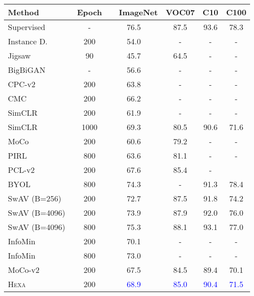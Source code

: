 \documentclass[10pt,twocolumn,letterpaper]{article}
\newcommand{\shortname}{\textsc{Hexa}}
\begin{document}
\begin{table}[t!]
\footnotesize \centering
\begin{tabular}{ @{\hspace{-0pt}}l@{\hspace{8pt}}c@{\hspace{2pt}}|@{\hspace{7pt}}c@{\hspace{7pt}}c@{\hspace{7pt}}c@{\hspace{7pt}}c}\toprule
 Method   & Epoch &  ~~ImageNet  &  VOC07 &  C10 &  C100  \\ 
\hline
Supervised & - & 76.5 &  87.5 & 93.6 & 78.3 \\
\hline
Instance D.~\cite{wu2018unsupervised} & 200 & 54.0 &  - & -  & -\\ Jigsaw~\cite{noroozi2016unsupervised} & 90 & 45.7 & 64.5 & - & -\\ BigBiGAN~\cite{donahue2019large} & - & 56.6 & - &  - & -\\
CPC-v2~\cite{henaff2019data} & 200 & 63.8 & - & - & -\\
CMC~\cite{tian2019contrastive} & 200 &  66.2 & - & - & -\\
SimCLR~\cite{chen2020simple} & 200 & 61.9 & -  & - & -\\
SimCLR~\cite{chen2020simple} & 1000 & 69.3 & 80.5 & 90.6 & 71.6 \\
MoCo~\cite{he2020momentum} & 200 & 60.6 & 79.2 & - & - \\ PIRL~\cite{misra2020self} & 800 & 63.6 & 81.1 & - & - \\ PCL-v2~\cite{li2020prototypical} & 200 & 67.6 & 85.4 & - & \\BYOL~\cite{grill2020bootstrap} & 800 & 74.3 & - & 91.3 & 78.4 \\
SwAV \!(B=256)\!~\cite{caron2020unsupervised} & 200 & 72.7 & 87.5 & 91.8 & 74.2 \\
SwAV \!(B=4096)\!~\cite{caron2020unsupervised} & 200 & 73.9 &  87.9 & 92.0 & 76.0 \\
SwAV \!(B=4096)\!~\cite{caron2020unsupervised} & 800 & 75.3 &  88.1 & 93.1 & 77.0 \\
InfoMin~\cite{tian2020makes} & 200 & 70.1 & - & - & -\\
InfoMin~\cite{tian2020makes} & 800 & 73.0 & - & - & - \\
\hline
 MoCo-v2~~ &  200  & 67.5 & 84.5 & 89.4 & 70.1\\
\rowcolor{Gray}
\cellcolor{white}
   \shortname{}  &  200   & \textcolor{blue}{68.9} & \textcolor{blue}{85.0} & \textcolor{blue}{90.4} &  \textcolor{blue}{71.5}

\end{tabular}
\end{table}
\end{document}
